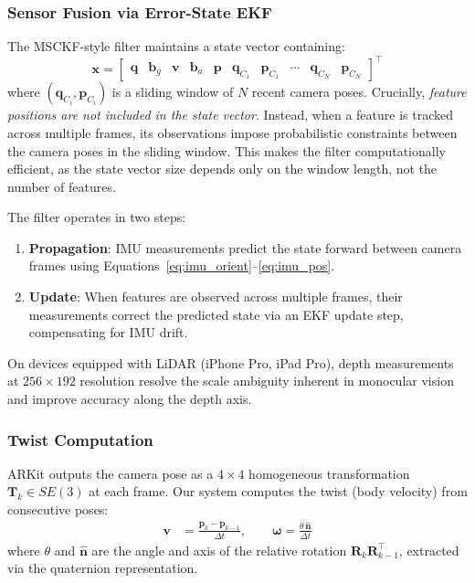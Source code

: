 \subsubsection{Sensor Fusion via Error-State EKF}

The MSCKF-style filter maintains a state vector containing:
\begin{equation}
    \mathbf{x} = \begin{bmatrix} \mathbf{q} & \mathbf{b}_g & \mathbf{v} & \mathbf{b}_a & \mathbf{p} & \mathbf{q}_{C_1} & \mathbf{p}_{C_1} & \cdots & \mathbf{q}_{C_N} & \mathbf{p}_{C_N} \end{bmatrix}^\top
\end{equation}
where $(\mathbf{q}_{C_i}, \mathbf{p}_{C_i})$ is a sliding window of $N$ recent camera poses. Crucially, \emph{feature positions are not included in the state vector}. Instead, when a feature is tracked across multiple frames, its observations impose probabilistic constraints between the camera poses in the sliding window. This makes the filter computationally efficient, as the state vector size depends only on the window length, not the number of features.

The filter operates in two steps:
\begin{enumerate}
    \item \textbf{Propagation}: IMU measurements predict the state forward between camera frames using Equations~\eqref{eq:imu_orient}--\eqref{eq:imu_pos}.
    \item \textbf{Update}: When features are observed across multiple frames, their measurements correct the predicted state via an EKF update step, compensating for IMU drift.
\end{enumerate}

On devices equipped with LiDAR (iPhone Pro, iPad Pro), depth measurements at $256 \times 192$ resolution resolve the scale ambiguity inherent in monocular vision and improve accuracy along the depth axis.

\subsubsection{Twist Computation}

ARKit outputs the camera pose as a $4 \times 4$ homogeneous transformation $\mathbf{T}_k \in SE(3)$ at each frame. Our system computes the twist (body velocity) from consecutive poses:
\begin{align}
    \mathbf{v} &= \frac{\mathbf{p}_k - \mathbf{p}_{k-1}}{\Delta t}, \qquad
    \boldsymbol{\omega} = \frac{\theta \, \hat{\mathbf{n}}}{\Delta t}
\end{align}
where $\theta$ and $\hat{\mathbf{n}}$ are the angle and axis of the relative rotation $\mathbf{R}_k \mathbf{R}_{k-1}^\top$, extracted via the quaternion representation.


